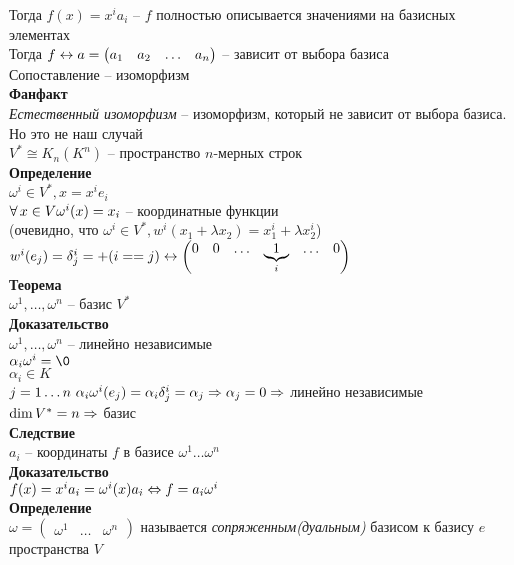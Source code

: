 \documentclass[12pt]{article}
\begin{document}
Тогда $f(x) = x^i a_i$ -- $f$ полностью описывается значениями на базисных элементах\\
Тогда $f \lrto a = \begin{pmatrix}
    a_1 & a_2 & \ldots & a_n
\end{pmatrix}$ -- зависит от выбора базиса\\
Сопоставление -- изоморфизм\\
\textbf{Фанфакт}\\
\textit{Естественный изоморфизм} -- изоморфизм, который не зависит от выбора базиса. Но это не наш случай\\
$V^* \cong K_n (K^n)$ -- пространство $n$-мерных строк\\
\textbf{Определение}\\
$\omega^i \in V^*, x = x^i e_i$\\
$\fall x\in V \omega^i (x)=x_i$ -- координатные функции\\
(очевидно, что $\omega^i \in V^*, w^i(x_1+\lambda x_2) = x_1^i + \lambda x_2^i$)\\
$w^i (e_j) = \delta_j^i = +(i == j) \lrto \begin{pmatrix}
    0 & 0 & \ldots & \ub{i}1 & \ldots & 0
\end{pmatrix}$\\
\textbf{Теорема}\\
$\omega^1, \ldots, \omega^n$ -- базис $V^*$\\
\textbf{Доказательство}\\
$\omega^1, \ldots, \omega^n$ -- линейно независимые\\
$\alpha_i \omega^i = \0$\\
$\alpha_i \in K$\\
$j=1\ldots n\ \alpha_i\omega^i(e_j)=\alpha_i \delta_j^i = \alpha_j \Rto \alpha_j = 0 \Rto $ линейно независимые\\
$\dim V^* = n \Rto $ базис\\
\textbf{Следствие}\\
$a_i$ -- координаты $f$ в базисе $\omega^1\dots\omega^n$\\
\textbf{Доказательство}\\
$f(x)=x^ia_i = \omega^i(x)a_i \LRto f=a_i\omega^i$\\
\textbf{Определение}\\
$\omega=\begin{pmatrix}
    \omega^1 & \ldots & \omega^n
\end{pmatrix}$ называется \textit{сопряженным(дуальным)} базисом к базису $e$ пространства $V$\\\\
\end{document}
